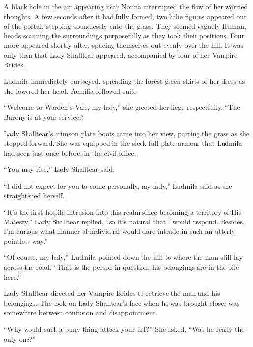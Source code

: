  

A black hole in the air appearing near Nonna interrupted the flow of her worried thoughts. A few seconds after it had fully formed, two lithe figures appeared out of the portal, stepping soundlessly onto the grass. They seemed vaguely Human, heads scanning the surroundings purposefully as they took their positions. Four more appeared shortly after, spacing themselves out evenly over the hill. It was only then that Lady Shalltear appeared, accompanied by four of her Vampire Brides.

 

Ludmila immediately curtseyed, spreading the forest green skirts of her dress as she lowered her head. Aemilia followed suit.

 

“Welcome to Warden’s Vale, my lady,” she greeted her liege respectfully. “The Barony is at your service.”

 

Lady Shalltear’s crimson plate boots came into her view, parting the grass as she stepped forward. She was equipped in the sleek full plate armour that Ludmila had seen just once before, in the civil office.

 

“You may rise,” Lady Shalltear said.

 

“I did not expect for you to come personally, my lady,” Ludmila said as she straightened herself.

 

“It’s the first hostile intrusion into this realm since becoming a territory of His Majesty,” Lady Shalltear replied, “so it’s natural that I would respond. Besides, I’m curious what manner of individual would dare intrude in such an utterly pointless way.”

 

“Of course, my lady,” Ludmila pointed down the hill to where the man still lay across the road. “That is the person in question; his belongings are in the pile here.”

 

Lady Shalltear directed her Vampire Brides to retrieve the man and his belongings. The look on Lady Shalltear’s face when he was brought closer was somewhere between confusion and disappointment.

 

“Why would such a puny thing attack your fief?” She asked, “Was he really the only one?”

